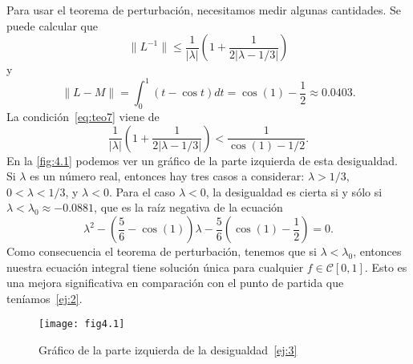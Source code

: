 \begin{ejemplo}
	Para usar el teorema de perturbación, necesitamos medir algunas cantidades. Se puede calcular que
	\begin{equation}
		\lVert L^{-1} \rVert \leqslant \dfrac{1}{|\lambda|}(1 + \dfrac{1}{2|\lambda - 1/3|})
	\end{equation}
	y
	\begin{equation}
		\lVert L-M \rVert = \int_{0}^{1} (t - \cos t)dt = \cos(1) - \dfrac{1}{2} \approx 0.0403.
	\end{equation}
	La condición~\eqref{eq:teo7} viene de
	\begin{equation}\label{ej:3}
		\dfrac{1}{|\lambda|}(1+\dfrac{1}{2|\lambda - 1/3|}) < \dfrac{1}{\cos(1)-1/2}.
	\end{equation}
	En la \autoref{fig:4.1} podemos ver un gráfico de la parte izquierda de esta desigualdad. Si $\lambda$ es un número real, entonces hay tres casos a considerar: $\lambda > 1/3$, $0 < \lambda < 1/3$, y $\lambda < 0$. Para el caso $\lambda < 0$, la desigualdad es cierta si y sólo si $\lambda < \lambda_0 \approx -0.0881$, que es la raíz negativa de la ecuación
	\begin{equation}
		\lambda^2 - (\dfrac{5}{6} - \cos(1)) \lambda - \dfrac{5}{6}(\cos(1) - \dfrac{1}{2}) = 0.
	\end{equation} 
	Como consecuencia el teorema de perturbación, tenemos que si $\lambda < \lambda_0$, entonces nuestra ecuación integral tiene solución única para cualquier $f \in \mathcal{C}[0,1]$. Esto es una mejora significativa en comparación con el punto de partida que teníamos~\eqref{ej:2}.
\end{ejemplo}
\begin{figure}[htb!]
	\centering
	\texttt{[image: fig4.1]}
	\caption{Gráfico de la parte izquierda de la desigualdad~\eqref{ej:3}}
	\label{fig:4.1}
\end{figure}
